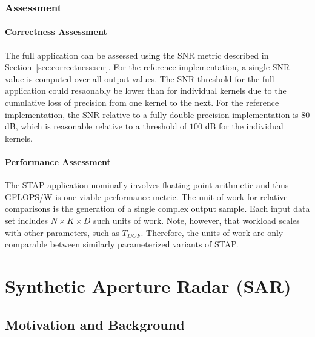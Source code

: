 \documentclass{report}
\begin{document}
\subsection{Assessment}

\subsubsection{Correctness Assessment}

The full application can be assessed using the SNR metric described
in Section~\ref{sec:correctness:snr}.
For the reference implementation, a single SNR value is computed over all
output values.
The SNR threshold for the full application could resaonably be lower than
for individual kernels due to the cumulative loss of precision from one
kernel to the next.
For the reference implementation, the SNR relative to a fully double precision
implementation is $80$ dB, which is reasonable relative to a threshold
of $100$ dB for the individual kernels.

\subsubsection{Performance Assessment}

The STAP application nominally involves floating point arithmetic and thus
GFLOPS/W is one viable performance metric.
The unit of work for relative comparisons is the generation of a single
complex output sample.
Each input data set includes $N \times K \times D$ such units of work.
Note, however, that workload scales with other parameters, such as
$T_{DOF}$.
Therefore, the units of work are only comparable between similarly
parameterized variants of STAP.


\chapter{Synthetic Aperture Radar (SAR)}


\section{Motivation and Background}
\end{document}
